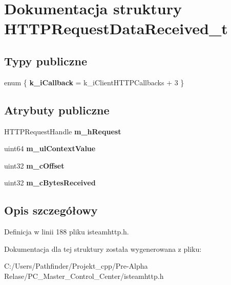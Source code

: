 \hypertarget{struct_h_t_t_p_request_data_received__t}{}\section{Dokumentacja struktury H\+T\+T\+P\+Request\+Data\+Received\+\_\+t}
\label{struct_h_t_t_p_request_data_received__t}
\subsection*{Typy publiczne}
\begin{DoxyCompactItemize}
\item 
\mbox{\label{struct_h_t_t_p_request_data_received__t_a16fc1d802be648c6302d4458565b8b37}} 
enum \{ {\bfseries k\+\_\+i\+Callback} = k\+\_\+i\+Client\+H\+T\+T\+P\+Callbacks + 3
 \}
\end{DoxyCompactItemize}
\subsection*{Atrybuty publiczne}
\begin{DoxyCompactItemize}
\item 
\mbox{\label{struct_h_t_t_p_request_data_received__t_a6e12c1532d58d976a7463334be5c04a8}} 
H\+T\+T\+P\+Request\+Handle {\bfseries m\+\_\+h\+Request}
\item 
\mbox{\label{struct_h_t_t_p_request_data_received__t_a1b39d1c0da68abec98eafafbc69d4394}} 
uint64 {\bfseries m\+\_\+ul\+Context\+Value}
\item 
\mbox{\label{struct_h_t_t_p_request_data_received__t_a43e645007f5bc418b1526cb3e2671e6f}} 
uint32 {\bfseries m\+\_\+c\+Offset}
\item 
\mbox{\label{struct_h_t_t_p_request_data_received__t_a7db829d0226f6da22c63fee1a3151f43}} 
uint32 {\bfseries m\+\_\+c\+Bytes\+Received}
\end{DoxyCompactItemize}


\subsection{Opis szczegółowy}


Definicja w linii 188 pliku isteamhttp.\+h.



Dokumentacja dla tej struktury została wygenerowana z pliku\+:\begin{DoxyCompactItemize}
\item 
C\+:/\+Users/\+Pathfinder/\+Projekt\+\_\+cpp/\+Pre-\/\+Alpha Relase/\+P\+C\+\_\+\+Master\+\_\+\+Control\+\_\+\+Center/isteamhttp.\+h\end{DoxyCompactItemize}

